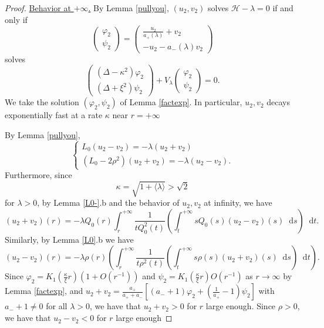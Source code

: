 \documentclass[11 pt]{amsart}
\newcommand{\tmem}{\underline}
\theoremstyle{definition}
\theoremstyle{remark}
\numberwithin{equation}{section}
\newcommand{\dd}{\mathop{}\!\mathrm{d}}
\begin{document}
\begin{proof} \underline{Behavior at $+\infty$.}
  By Lemma \ref{pullyou}, $(u_2, v_2)$ solves $\mathcal{H}- \lambda = 0$ if
  and only if
\[ \left(\begin{array}{c}
       \varphi_2\\
       \psi_2
     \end{array}\right) = \left(\begin{array}{c}
       \frac{u_2}{a_+ (\lambda)} + v_2\\
       - u_2 - a_- (\lambda) v_2
     \end{array}\right) \]
  solves
  \[ \left(\begin{array}{c}
       (\Delta - \kappa^2) \varphi_2\\
       (\Delta + \xi^2) \psi_2
     \end{array}\right) + V_{\lambda} \left(\begin{array}{c}
       \varphi_2\\
       \psi_2
     \end{array}\right) = 0. \]
We take the solution $(\varphi_2,\psi_2)$ of Lemma \ref{factexp}. In particular, $u_2, v_2$ decays exponentially fast at a rate
  $\kappa$ near $r = + \infty$
  
\medskip

\noindent {\tmem{Behavior at $0$.}}
By Lemma \ref{pullyou},
  \[ \left\{\begin{array}{l}
       L_0 (u_2 - v_2) = - \lambda (u_2 + v_2)\\
       (L_0 - 2 \rho^2) (u_2 + v_2) = - \lambda (u_2 - v_2) .
     \end{array}\right. \]
  Furthermore, since
  \[ \kappa = \sqrt{1 + \langle \lambda \rangle} > \sqrt{2} \]
  for $\lambda > 0$, by Lemma \ref{L0-}.b and the behavior of $u_2, v_2$ at
  infinity, we have
  \[ (u_2 + v_2) (r) = - \lambda Q_0 (r) \int_r^{+ \infty} \frac{1}{t Q_0^2
     (t)} \left( \int_t^{+ \infty} s Q_0 (s) (u_2 - v_2) (s)\dd s\right)\dd t .
  \]
  Similarly, by Lemma \ref{L0}.b we have
  \[ (u_2 - v_2) (r) = - \lambda \rho (r) \left( \int_r^{+ \infty} \frac{1}{t
     \rho^2 (t)} \left( \int_t^{+ \infty} s \rho (s) (u_2 + v_2) (s)\dd s
     \right)\dd t  \right) . \]
  Since $\varphi_2=K_1(\frac{\kappa}{\xi}r)(1+O(r^{-1}))$ and $\psi_2=K_1(\frac{\kappa}{\xi}r)O(r^{-1})$ as $r\to \infty$ by Lemma \ref{factexp}, and $u_2+v_2=\frac{a_+}{a_++a_-}[(a_-+1)\varphi_2+(\frac{1}{a_+}-1)\psi_2]$ with $a_-+1\neq0$ for all $\lambda>0$, we have that $u_2 + v_2 > 0$ for $r$ large enough.
  Since $\rho > 0$, we have that $u_2 - v_2 < 0$ for $r$ large enough
  

\end{proof}
\end{document}
